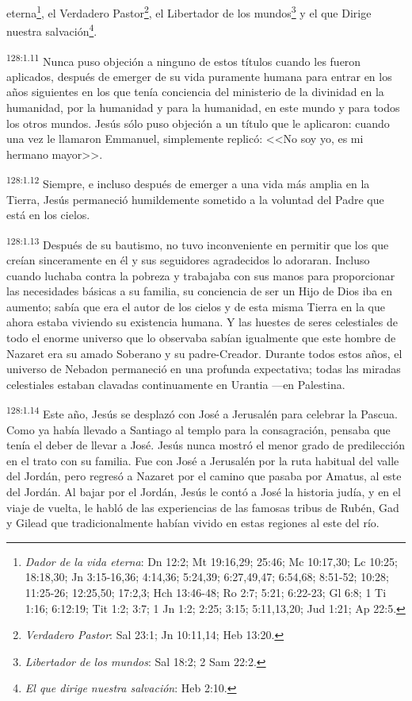 eterna\footnote{\textit{Dador de la vida eterna}: Dn 12:2; Mt 19:16,29; 25:46; Mc 10:17,30; Lc 10:25; 18:18,30; Jn 3:15-16,36; 4:14,36; 5:24,39; 6:27,49,47; 6:54,68; 8:51-52; 10:28; 11:25-26; 12:25,50; 17:2,3; Hch 13:46-48; Ro 2:7; 5:21; 6:22-23; Gl 6:8; 1 Ti 1:16; 6:12:19; Tit 1:2; 3:7; 1 Jn 1:2; 2:25; 3:15; 5:11,13,20; Jud 1:21; Ap 22:5.}, el Verdadero Pastor\footnote{\textit{Verdadero Pastor}: Sal 23:1; Jn 10:11,14; Heb 13:20.}, el Libertador de los mundos\footnote{\textit{Libertador de los mundos}: Sal 18:2; 2 Sam 22:2.} y el que Dirige nuestra salvación\footnote{\textit{El que dirige nuestra salvación}: Heb 2:10.}.

\par 
\textsuperscript{128:1.11} Nunca puso objeción a ninguno de estos títulos cuando les fueron aplicados, después de emerger de su vida puramente humana para entrar en los años siguientes en los que tenía conciencia del ministerio de la divinidad en la humanidad, por la humanidad y para la humanidad, en este mundo y para todos los otros mundos. Jesús sólo puso objeción a un título que le aplicaron: cuando una vez le llamaron Emmanuel, simplemente replicó: <<No soy yo, es mi hermano mayor>>.

\par 
\textsuperscript{128:1.12} Siempre, e incluso después de emerger a una vida más amplia en la Tierra, Jesús permaneció humildemente sometido a la voluntad del Padre que está en los cielos.

\par 
\textsuperscript{128:1.13} Después de su bautismo, no tuvo inconveniente en permitir que los que creían sinceramente en él y sus seguidores agradecidos lo adoraran. Incluso cuando luchaba contra la pobreza y trabajaba con sus manos para proporcionar las necesidades básicas a su familia, su conciencia de ser un Hijo de Dios iba en aumento; sabía que era el autor de los cielos y de esta misma Tierra en la que ahora estaba viviendo su existencia humana. Y las huestes de seres celestiales de todo el enorme universo que lo observaba sabían igualmente que este hombre de Nazaret era su amado Soberano y su padre-Creador. Durante todos estos años, el universo de Nebadon permaneció en una profunda expectativa; todas las miradas celestiales estaban clavadas continuamente en Urantia ---en Palestina.

\par 
\textsuperscript{128:1.14} Este año, Jesús se desplazó con José a Jerusalén para celebrar la Pascua. Como ya había llevado a Santiago al templo para la consagración, pensaba que tenía el deber de llevar a José. Jesús nunca mostró el menor grado de predilección en el trato con su familia. Fue con José a Jerusalén por la ruta habitual del valle del Jordán, pero regresó a Nazaret por el camino que pasaba por Amatus, al este del Jordán. Al bajar por el Jordán, Jesús le contó a José la historia judía, y en el viaje de vuelta, le habló de las experiencias de las famosas tribus de Rubén, Gad y Gilead que tradicionalmente habían vivido en estas regiones al este del río.

